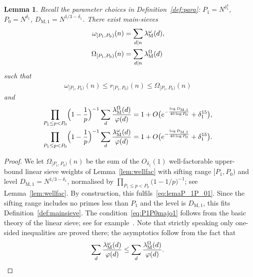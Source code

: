 \documentclass[12pt]{amsart}
\newtheorem{lemma}[theorem]{Lemma}
\theoremstyle{definition}
\theoremstyle{remark}
\numberwithin{equation}{section}
\newcommand{\1}{\mathbf{1}}
\begin{document}
\begin{lemma}\label{lem:P_1P_0majo}
    Recall the parameter choices in Definition~\ref{def:para}: $P_1=N^{\delta_1^4}$, $P_0=N^{\delta_1}$, $D_{\mathrm{M},1}=N^{1/3-\delta_1}$. There exist main-sieves
    \begin{align*}
        \omega_{[P_1,P_0)}(n)&=\sum_{d\mid n}\lambda^\omega_{\textup{M}}(d),\\
        \Omega_{[P_1,P_0)}(n)&=\sum_{d\mid n}\lambda^\Omega_{\textup{M}}(d)
    \end{align*}
    such that
    \begin{align}\label{eq:lemaP_1P_01}
         \omega_{[P_1,P_0)}(n)\leq r_{[P_1,P_0)}(n) \leq  \Omega_{[P_1,P_0)}(n)
    \end{align}
    and
    \begin{align}
    \label{eq:P1P0majo1} 
    \begin{aligned}
    \prod_{P_1\leq p < P_0}\Bigl(1-\frac{1}{p}\Bigr)^{-1}\sum_{d}\frac{\lambda^\Omega_{\textup{M}}(d)}{\varphi(d)}&=1+O\bigl(e^{-\frac{\log D_{\mathrm{M},1}}{40 \log P_0}}+\delta_1^{15}\bigr),\\
        \prod_{P_1\leq p < P_0}\Bigl(1-\frac{1}{p}\Bigr)^{-1}\sum_{d}\frac{\lambda^\omega_{\textup{M}}(d)}{\varphi(d)}&=1+O\bigl(e^{-\frac{\log D_{\mathrm{M},1}}{40 \log P_0}}+\delta_1^{15}\bigr).
       \end{aligned}
    \end{align}
\end{lemma}
\begin{proof}
    We let $\Omega_{[P_1,P_0)}(n)$ be the sum of the $O_{\delta_1}(1)$ well-factorable upper-bound linear sieve weights of Lemma~\ref{lem:wellfac} with sifting range $[P_1,P_0)$ and level $D_{\mathrm{M},1}=N^{1/3-\delta_1}$, normalised by $\prod_{P_1\leq p < P_0}\bigl(1-1/p\bigr)^{-1}$; see Lemma~\ref{lem:wellfac}. By construction, this fulfils~\eqref{eq:lemaP_1P_01}. Since the sifting range includes no primes less than $P_1$ and the level is $D_{\mathrm{M},1}$, this fits Definition~\ref{def:mainsieve}. The condition~\eqref{eq:P1P0majo1} follows from the basic theory of the linear sieve; see for example~\cite[Theorem 11.12, eq. (11.134)]{cribro}. Note that strictly speaking only one-sided inequalities are proved there; the asymptotics follow from the fact that 
    \begin{align*}
       \sum_{d} \frac{\lambda^\omega_{\textup{M}}(d)}{\varphi(d)}\leq \sum_d \frac{\lambda^\Omega_{\textup{M}}(d)}{\varphi(d)}.
    \end{align*}
\end{proof}
\end{document}
